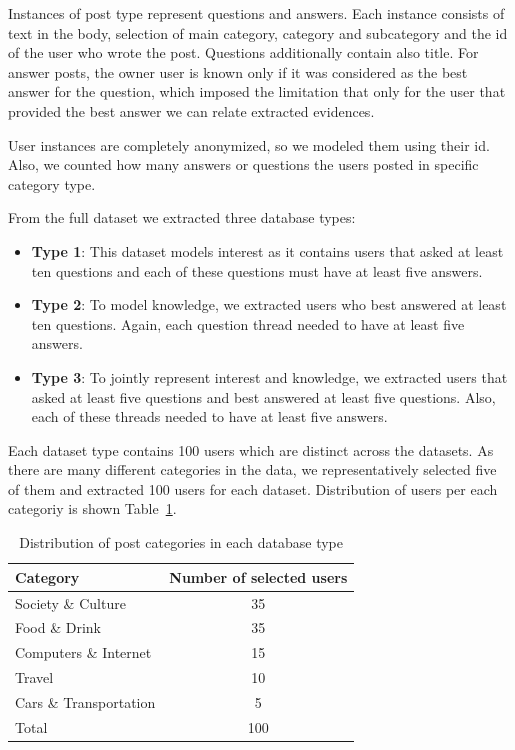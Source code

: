 \documentclass[conference]{IEEEtran}
\newcommand{\tblref}[1]{Table~\ref{#1}}
\begin{document}
Instances of post type represent questions and answers. Each instance consists of text in the body, selection of main category, category and subcategory and the id of the user who wrote the post. Questions additionally contain also title. For answer posts, the owner user is known only if it was considered as the best answer for the question, which imposed the limitation that only for the user that provided the best answer we can relate extracted evidences.

User instances are completely anonymized, so we modeled them using their id. Also, we counted how many answers or questions the users posted in specific category type.

From the full dataset we extracted three database types:
\begin{itemize}
	\item {\bf Type 1}: This dataset models interest as it contains users that asked at least ten questions and each of these questions must have at least five answers.
	\item {\bf Type 2}: To model knowledge, we extracted users who best answered at least ten questions. Again, each question thread needed to have at least five answers.
	\item {\bf Type 3}: To jointly represent interest and knowledge, we extracted users that asked at least five questions and best answered at least five questions. Also, each of these threads needed to have at least five answers.
\end{itemize}
Each dataset type contains 100 users which are distinct across the datasets. As there are many different categories in the data, we representatively selected five of them and extracted 100 users for each dataset. Distribution of users per each categoriy is shown \tblref{tab:datasets}.

\begin{table}[!h]
	\centering
	\renewcommand{\arraystretch}{1.3}
	\caption{Distribution of post categories in each database type}
	\label{tab:datasets}
	\begin{tabular}{l|c}\hline
		Category & Number of selected users\\\hline\hline
		Society \& Culture & 35\\
		Food \& Drink & 35\\
		Computers \& Internet & 15\\
		Travel & 10\\
		Cars \& Transportation & 5\\\hline\hline
		Total & 100\\\hline
	\end{tabular}
\end{table}
\end{document}
